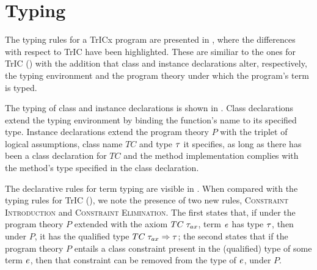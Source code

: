 \section{Typing}
\label{clstyping}
The typing rules for a TrICx program are presented in , where the differences with respect to TrIC have been highlighted. These are similiar to the ones for TrIC () with the addition that class and instance declarations alter, respectively, the typing environment and the program theory under which the program's term is typed.

The typing of class and instance declarations is shown in . Class declarations extend the typing environment by binding the function's name to its specified type. Instance declarations extend the program theory $P$ with the triplet of logical assumptions, class name $TC$ and type $\mathit{\tau}$ it specifies, as long as there has been a class declaration for $TC$ and the method implementation complies with the method's type specified in the class declaration.

The declarative rules for term typing are visible in . When compared with the typing rules for TrIC (), we note the presence of two new rules, \textsc{Constraint Introduction} and \textsc{Constraint Elimination}. The first states that, if under the program theory $P$ extended with the axiom $TC \;\mathit{\tau}_{ax}$, term $\mathit{e}$ has type $\mathit{\tau}$, then under $P$, it has the qualified type $TC\;\mathit{\tau}_{ax} \Rightarrow \mathit{\tau}$; the second states that if the program theory $P$ entails a class constraint present in the (qualified) type of some term $\mathit{e}$, then that constraint can be removed from the type of $\mathit{e}$, under $P$.


